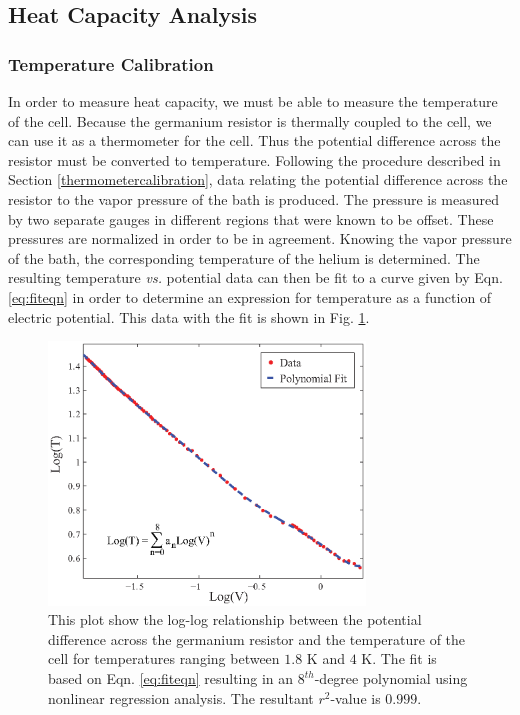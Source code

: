 \subsection{Heat Capacity Analysis}\label{heatcapacityanalysis}
\subsubsection{Temperature Calibration}\label{temperaturecalibration}

In order to measure heat capacity, we must be able to measure the temperature of the cell.  Because the germanium resistor is thermally coupled to the cell, we can use it as a thermometer for the cell.  Thus the potential difference across the resistor must be converted to temperature.  Following the procedure described in Section \ref{thermometercalibration}, data relating the potential difference across the resistor to the vapor pressure of the bath is produced.  The pressure is measured by two separate gauges in different regions that were known to be offset.  These pressures are normalized in order to be in agreement.  Knowing the vapor pressure of the bath, the corresponding temperature of the helium is determined. The resulting temperature \emph{vs.} potential data can then be fit to a curve given by Eqn. \ref{eq:fiteqn} in order to determine an expression for temperature as a function of electric potential.  This data with the fit is shown in Fig. \ref{fig:polyfit}.  
\begin{figure}[htbp]
\begin{center}
\includegraphics[height=70mm]{./figures/polyfit.eps}
\caption{\small{This plot show the log-log relationship between the potential difference across the germanium resistor and the temperature of the cell for temperatures ranging between $1.8$ K and $4$ K.  The fit is based on Eqn. \ref{eq:fiteqn} resulting in an $8^{th}$-degree polynomial using nonlinear regression analysis.  The resultant $r^{2}$-value is $0.999$.}}
\label{fig:polyfit}
\end{center}
\end{figure}

